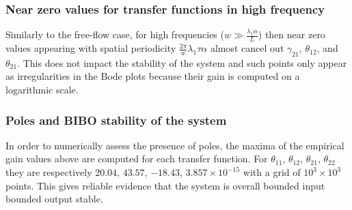 \documentclass[preprint]{elsarticle}
\begin{document}
\subsubsection{Near zero values for transfer functions in high frequency}
Similarly to the free-flow case, for high frequencies ($w \gg \frac{\lambda_{1} \alpha}{L}$) then near zero values appearing with spatial periodicity $\frac{2 \pi}{w} \lambda_{1} \tau \alpha$ almost cancel out $\gamma_{21}$, $\theta_{12}$, and $\theta_{21}$. This does not impact the stability of the system and such points only appear as irregularities in the Bode plots because their gain is computed on a logarithmic scale.

\subsubsection{Poles and BIBO stability of the system}
In order to numerically assess the presence of poles, the maxima of the empirical gain values above are computed for each transfer function. For $\theta_{11}$, $\theta_{12}$, $\theta_{21}$, $\theta_{22}$ they are respectively $20.04$, $43.57$, $-18.43$, $3.857\times10^{-15}$ with a grid of $10^3 \times 10^3$ points. This gives reliable evidence that the system is overall bounded input bounded output stable.
\end{document}
